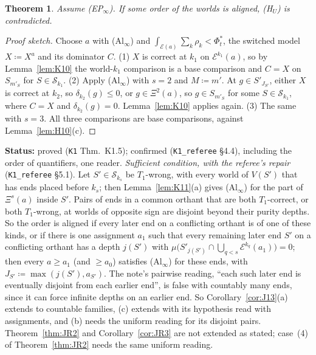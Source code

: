 \documentclass[11pt]{article}
\newtheorem{theorem}{Theorem}[section]
\theoremstyle{definition}
\theoremstyle{remark}
\newcommand{\src}[1]{\texttt{#1}}
\newcommand{\status}[1]{\par\smallskip\noindent\textbf{Status:} #1\par\smallskip}
\begin{document}
\begin{theorem}\label{thm:K15}
Assume (EP$_\infty$). If some order of the worlds is aligned, (H$_U$) is contradicted.
\end{theorem}
\begin{proof}[Proof sketch]
Choose $a$ with (Al$_\infty$) and $\int_{\mathcal E(a)}\sum_k\rho_k<\Phi^*_t$, the switched model $X\coloneqq X^a$ and its dominator $C$. (1) $X$ is correct at $k_1$ on $\mathcal E^{k_1}(a)$, so by Lemma~\ref{lem:K10} the world-$k_1$ comparison is a base comparison and $C=X$ on $S_{m'_S}$ for $S\in\mathcal S_{k_1}$. (2) Apply (Al$_\infty$) with $s=2$ and $M\coloneqq m'$. At $g\in S'_{J_{S'}}$, either $X$ is correct at $k_2$, so $\delta_{k_2}(g)\le0$, or $g\in\Xi^2(a)$, so $g\in S_{m'_S}$ for some $S\in\mathcal S_{k_1}$, where $C=X$ and $\delta_{k_2}(g)=0$. Lemma~\ref{lem:K10} applies again. (3) The same with $s=3$. All three comparisons are base comparisons, against Lemma~\ref{lem:H10}(c).
\end{proof}
\status{proved (\src{K1} Thm.~K1.5); confirmed (\src{K1\_referee} \S4.4), including the order of quantifiers, one reader. \emph{Sufficient condition, with the referee's repair} (\src{K1\_referee} \S5.1). Let $S'\in\mathcal S_{k_s}$ be $T_1$-wrong, with every world of $V(S')$ that has ends placed before $k_s$; then Lemma~\ref{lem:K11}(a) gives (Al$_\infty$) for the part of $\Xi^s(a)$ inside $S'$. Pairs of ends in a common orthant that are both $T_1$-correct, or both $T_1$-wrong, at worlds of opposite sign are disjoint beyond their purity depths. So the order is aligned if every later end on a conflicting orthant is of one of these kinds, or if there is one assignment $a_1$ such that every remaining later end $S'$ on a conflicting orthant has a depth $j(S')$ with $\mu\bigl(S'_{j(S')}\cap\bigcup_{q<s}\mathcal E^{k_q}(a_1)\bigr)=0$; then every $a\ge a_1$ (and $\ge a_0$) satisfies (Al$_\infty$) for these ends, with $J_{S'}\coloneqq\max(j(S'),a_{S'})$. The note's pairwise reading, ``each such later end is eventually disjoint from each earlier end'', is false with countably many ends, since it can force infinite depths on an earlier end. So Corollary~\ref{cor:J13}(a) extends to countable families, (c) extends with its hypothesis read with assignments, and (b) needs the uniform reading for its disjoint pairs. Theorem~\ref{thm:JR2} and Corollary~\ref{cor:JR3} are not extended as stated; case~(4) of Theorem~\ref{thm:JR2} needs the same uniform reading.}
\end{document}
